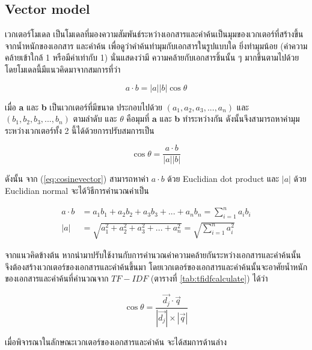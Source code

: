 \documentclass[11pt,a4paper]{article}
\begin{document}
{{{\newpage

\subsection{Vector model}

เวกเตอร์โมเดล เป็นโมเดลที่มองความสัมพันธ์ระหว่างเอกสารและคำค้นเป็นมุมของเวกเตอร์ที่สร้างขึ้นจากน้ำหนักของเอกสาร
และคำค้น เพื่อดูว่าคำค้นทำมุมกับเอกสารในรูปแบบใด ยิ่งทำมุมน้อย (ค่าความคล้ายเข้าใกล้ 1 หรือมีค่าเท่ากับ 1) นั่นแสดงว่ามี
ความคล้ายกับเอกสารชิ้นนั้น ๆ มากขึ้นตามไปด้วย โดยโมเดลนี้มีแนวคิดมาจากสมการที่ว่า

\begin{equation*}
    a \cdot b = |a||b| \cos \theta
\end{equation*}

เมื่อ {\bf a} และ {\bf b} เป็นเวกเตอร์ที่มีขนาด ประกอบไปด้วย $(a_1, a_2, a_3, ..., a_n)$ 
และ $(b_1, b_2, b_3, ..., b_n)$ ตามลำดับ และ $\theta$ คือมุมที่ {\bf a} และ {\bf b} ทำระหว่างกัน
ดังนั้นจึงสามารถหาค่ามุมระหว่างเวกเตอร์ทั้ง 2 นี้ได้ด้วยการปรับสมการเป็น

\begin{equation}
    \cos \theta = \frac{a \cdot b}{|a||b|} 
    \label{eq:cosinevector}
\end{equation}


ดังนั้น จาก (\ref{eq:cosinevector}) สามารถหาค่า $a \cdot b$ ด้วย Euclidian dot product และ $|a|$ ด้วย 
Euclidian normal จะได้วิธีการคำนวณค่าเป็น 

\begin{align*}
    a \cdot b   & = a_1 b_1 +  a_2 b_2 + a_3 b_3 + ... + a_n b_n = \sum_{i=1}^n a_i b_i \\
    |a|         & = \sqrt{a_1^2 + a_2^2 + a_3^2 + ... + a_n^2} = \sqrt{\sum_{i=1}^n a_i^2}
\end{align*}

จากแนวคิดข้างต้น หากนำมาปรับใช้งานกับการคำนวณค่าความคล้ายกันระหว่างเอกสารและคำค้นนั้น จึงต้องสร้างเวกเตอร์ของเอกสารและคำค้นขึ้นมา
โดยเวกเตอร์ของเอกสารและคำค้นนั้นจะอาศัยน้ำหนักของเอกสารและคำค้นที่คำนวณจาก $TF-IDF$ (ตารางที่ \ref{tab:tfidfcalculate}) ได้ว่า

\begin{equation*}
    \cos \theta = \frac{\overrightarrow{d_j} \cdot {\overrightarrow{q}}}{|\overrightarrow{d_j}| \times |\overrightarrow{q}|}
    \label{eq:coseq}
\end{equation*}

เมื่อพิจารณาในลักษณะเวกเตอร์ของเอกสารและคำค้น จะได้สมการด้านล่าง

}}}
\end{document}

